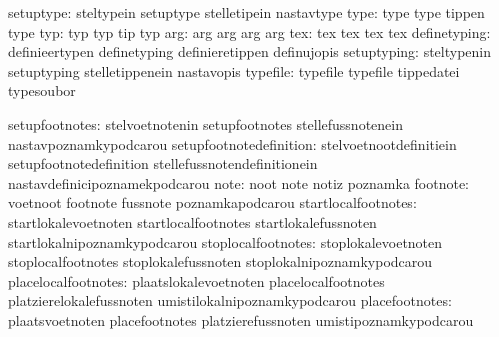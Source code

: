                     setuptype:  steltypein                   setuptype
                                stelletipein                 nastavtype
                         type:  type                         type
                                tippen                       type
                          typ:  typ                          typ
                                tip                          typ
                          arg:  arg                          arg
                                arg                          arg
                          tex:  tex                          tex
                                tex                          tex
                 definetyping:  definieertypen               definetyping
                                definieretippen              definujopis
                  setuptyping:  steltypenin                  setuptyping
                                stelletippenein              nastavopis
                     typefile:  typefile                     typefile
                                tippedatei                   typesoubor

               setupfootnotes:  stelvoetnotenin              setupfootnotes
                                stellefussnotenein           nastavpoznamkypodcarou
      setupfootnotedefinition:  stelvoetnootdefinitiein      setupfootnotedefinition
                                stellefussnotendefinitionein nastavdefinicipoznamekpodcarou
                         note:  noot                         note
                                notiz                        poznamka
                     footnote:  voetnoot                     footnote
                                fussnote                     poznamkapodcarou
          startlocalfootnotes:  startlokalevoetnoten         startlocalfootnotes
                                startlokalefussnoten         startlokalnipoznamkypodcarou
           stoplocalfootnotes:  stoplokalevoetnoten          stoplocalfootnotes
                                stoplokalefussnoten          stoplokalnipoznamkypodcarou
          placelocalfootnotes:  plaatslokalevoetnoten        placelocalfootnotes
                                platzierelokalefussnoten     umistilokalnipoznamkypodcarou
               placefootnotes:  plaatsvoetnoten              placefootnotes
                                platzierefussnoten           umistipoznamkypodcarou

